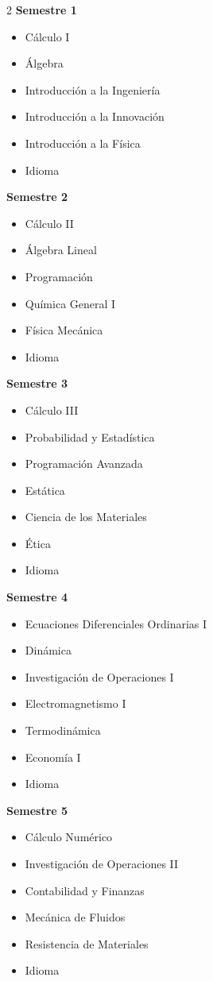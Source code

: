 \documentclass[12pt,a4paper]{article}
\begin{document}
	\begin{multicols}{2}
		\textbf{Semestre 1}
		\begin{itemize}
			\item Cálculo I
			\item Álgebra
			\item Introducción a la Ingeniería
			\item Introducción a la Innovación
			\item Introducción a la Física
			\item Idioma
		\end{itemize}
		
		\textbf{Semestre 2}
		\begin{itemize}
			\item Cálculo II
			\item Álgebra Lineal
			\item Programación
			\item Química General I
			\item Física Mecánica
			\item Idioma
		\end{itemize}
		
		\textbf{Semestre 3}
		\begin{itemize}
			\item Cálculo III
			\item Probabilidad y Estadística
			\item Programación Avanzada
			\item Estática
			\item Ciencia de los Materiales
			\item Ética
			\item Idioma
		\end{itemize}
		
		\textbf{Semestre 4}
		\begin{itemize}
			\item Ecuaciones Diferenciales Ordinarias I
			\item Dinámica
			\item Investigación de Operaciones I
			\item Electromagnetismo I
			\item Termodinámica
			\item Economía I
			\item Idioma
		\end{itemize}
		
		\textbf{Semestre 5}
		\begin{itemize}
			\item Cálculo Numérico
			\item Investigación de Operaciones II
			\item Contabilidad y Finanzas
			\item Mecánica de Fluidos
			\item Resistencia de Materiales
			\item Idioma
		\end{itemize}
		

\end{multicols}
\end{document}

